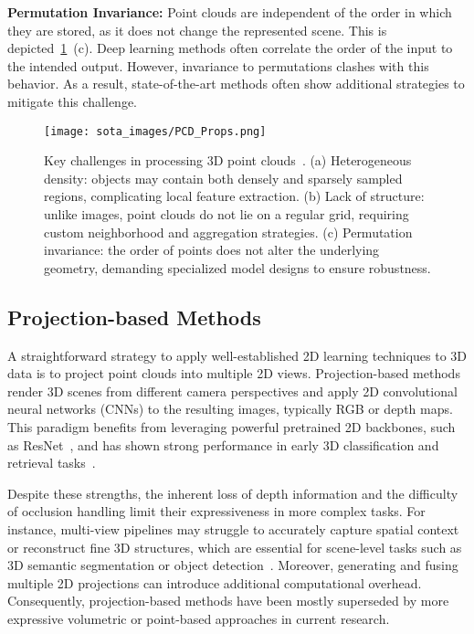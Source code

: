 \textbf{Permutation Invariance:} Point clouds are independent of the order
in which they are stored, as it does not change the represented scene.
This is depicted~\ref{fig:pcd_props}~(c).
Deep learning methods often correlate the order of the input to the
intended output. However, invariance to permutations clashes with this
behavior. As a result, state-of-the-art methods often show additional
strategies to mitigate this challenge.

\begin{figure}[t]
    \centering
    \texttt{[image: sota\_images/PCD\_Props.png]}
    \caption[Key challenges in processing 3D point clouds]
            {Key challenges in processing 3D point clouds~\cite{bello2020deep}.
        (a) Heterogeneous density: objects may contain both densely and sparsely sampled regions,
        complicating local feature extraction.
        (b) Lack of structure: unlike images, point clouds do not lie on a regular grid,
        requiring custom neighborhood and aggregation strategies.
        (c) Permutation invariance: the order of points does not alter the underlying geometry,
        demanding specialized model designs to ensure robustness.}\label{fig:pcd_props}
\end{figure}

\subsection{Projection-based Methods}
A straightforward strategy to apply well-established 2D learning techniques to
3D data is to project point clouds into multiple 2D views.
%
Projection-based methods render 3D scenes from different camera perspectives
and apply 2D convolutional neural networks (CNNs) to the resulting images,
typically RGB or depth maps. This paradigm benefits from leveraging powerful
pretrained 2D backbones, such as ResNet~\cite{he2015deep}, and has shown strong
performance in early 3D classification and retrieval
tasks~\cite{su2015multi,feng2018gvcnn,yang2019learning,lawin2017deep,lyu2020learning}.
%

Despite these strengths, the inherent loss of depth information and the
difficulty of occlusion handling limit their expressiveness in more complex
tasks. For instance, multi-view pipelines may struggle to accurately capture
spatial context or reconstruct fine 3D structures, which are essential for
scene-level tasks such as 3D semantic segmentation or object
detection~\cite{guo2020deep}.
%
Moreover, generating and fusing multiple 2D projections can introduce
additional computational overhead.
%
Consequently, projection-based methods have been mostly superseded by more
expressive volumetric or point-based approaches in current research.

